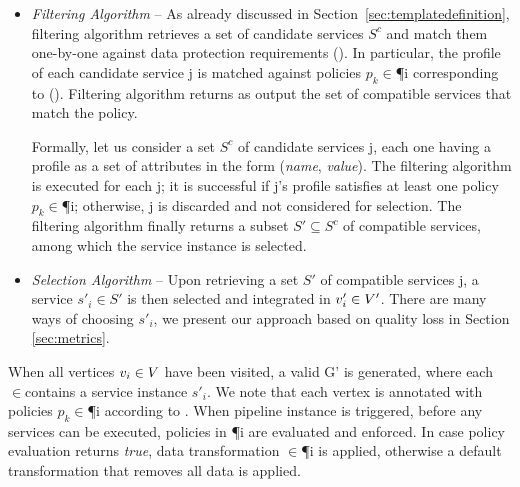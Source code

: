   \begin{itemize}

    \item \textit{Filtering Algorithm} -- As already discussed in Section~\ref{sec:templatedefinition}, filtering algorithm retrieves a set of candidate services $S^c$ and match them one-by-one against data protection requirements \myLambda(). In particular, the profile of each candidate service \si{j} is matched against policies $p_k$$\in$\P{i} corresponding to \myLambda(). Filtering algorithm returns as output the set of compatible services that match the policy.

    Formally, let us consider a set $S^c$ of candidate services \si{j}, each one having a profile as a set of attributes in the form (\emph{name}, \emph{value}). The filtering algorithm is executed for each \si{j}; it is successful if \si{j}'s profile satisfies at least one policy $p_k$$\in$\P{i}; otherwise, \si{j} is discarded and not considered for selection. The filtering algorithm finally returns a subset $S'\subseteq S^c$ of compatible services, among which the service instance is selected. 

    \item \textit{Selection Algorithm} -- Upon retrieving a set $S'$ of compatible services \si{j}, a service $s'_i$$\in$$S'$ is then selected and integrated in $v'_{i}\in V'$. There are many ways of choosing $s'_i$, we present our approach based on quality loss in Section \ref{sec:metrics}.
  \end{itemize}

  When all vertices $v_{i}\in V$ have been visited, a valid \pipelineInstance G' is generated, where each $\in$\Vp contains a service instance $s'_i$. We note that each vertex  is annotated with policies $p_k$$\in$\P{i} according to \myLambda. When pipeline instance is triggered, before any services can be executed, policies in \P{i} are evaluated and enforced. In case policy evaluation returns \emph{true}, data transformation \TP$\in$\P{i} is applied, otherwise a default transformation that removes all data is applied.

